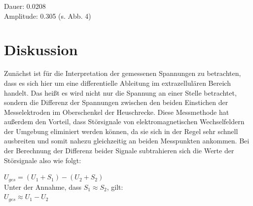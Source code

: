 Dauer: 0.0208\\
Amplitude: 0.305 (s. Abb. 4)

\section{Diskussion}
Zunächst ist für die Interpretation der gemessenen Spannungen zu betrachten, dass es sich hier um eine differentielle Ableitung im extrazellulären Bereich handelt. Das heißt es wird nicht nur die Spannung an einer Stelle betrachtet, sondern die Differenz der Spannungen zwischen den beiden Einstichen der Messelektroden im Oberschenkel der Heuschrecke. Diese Messmethode hat außerdem den Vorteil, dass Störsignale von elektromagnetischen Wechselfeldern der Umgebung eliminiert werden können, da sie sich in der Regel sehr schnell ausbreiten und somit nahezu gleichzeitig an beiden Messpunkten ankommen. Bei der Berechnung der Differenz beider Signale subtrahieren sich die Werte der Störsignale also wie folgt:
\begin{center}
$U_{ges}= (U_1+S_1) - (U_2 + S_2)$ \\

Unter der Annahme, dass $S_1 \approx S_2$, gilt: \\

$U_{ges} \approx U_1 - U_2$
\end{center}

